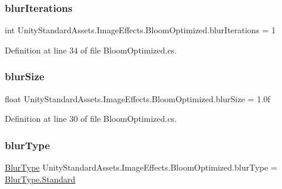 \subsubsection{\texorpdfstring{blur\+Iterations}{blurIterations}}
{\footnotesize\ttfamily int Unity\+Standard\+Assets.\+Image\+Effects.\+Bloom\+Optimized.\+blur\+Iterations = 1}



Definition at line 34 of file Bloom\+Optimized.\+cs.

\mbox{\label{class_unity_standard_assets_1_1_image_effects_1_1_bloom_optimized_ad48371677d49eada1100c19f3f8a977c}} 
\subsubsection{\texorpdfstring{blur\+Size}{blurSize}}
{\footnotesize\ttfamily float Unity\+Standard\+Assets.\+Image\+Effects.\+Bloom\+Optimized.\+blur\+Size = 1.\+0f}



Definition at line 30 of file Bloom\+Optimized.\+cs.

\mbox{\label{class_unity_standard_assets_1_1_image_effects_1_1_bloom_optimized_acb813777e2dbedf40aecc524f7551af6}} 
\subsubsection{\texorpdfstring{blur\+Type}{blurType}}
{\footnotesize\ttfamily \mbox{\hyperlink{class_unity_standard_assets_1_1_image_effects_1_1_bloom_optimized_a79317d54ae2cad9590852d264ebeabbf}{Blur\+Type}} Unity\+Standard\+Assets.\+Image\+Effects.\+Bloom\+Optimized.\+blur\+Type = \mbox{\hyperlink{class_unity_standard_assets_1_1_image_effects_1_1_bloom_optimized_a79317d54ae2cad9590852d264ebeabbfaeb6d8ae6f20283755b339c0dc273988b}{Blur\+Type.\+Standard}}}



